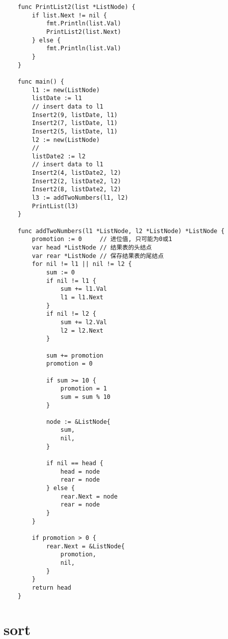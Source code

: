\documentclass[oneside,12pt,twiside,a4paper]{ctexbook}
\begin{document}
\begin{lstlisting}
    func PrintList2(list *ListNode) {
        if list.Next != nil {
            fmt.Println(list.Val)
            PrintList2(list.Next)
        } else {
            fmt.Println(list.Val)
        }
    }
    
    func main() {
        l1 := new(ListNode)
        listDate := l1
        // insert data to l1
        Insert2(9, listDate, l1)
        Insert2(7, listDate, l1)
        Insert2(5, listDate, l1)
        l2 := new(ListNode)
        //
        listDate2 := l2
        // insert data to l1
        Insert2(4, listDate2, l2)
        Insert2(2, listDate2, l2)
        Insert2(8, listDate2, l2)
        l3 := addTwoNumbers(l1, l2)
        PrintList(l3)
    }
    
    func addTwoNumbers(l1 *ListNode, l2 *ListNode) *ListNode {
        promotion := 0     // 进位值, 只可能为0或1
        var head *ListNode // 结果表的头结点
        var rear *ListNode // 保存结果表的尾结点
        for nil != l1 || nil != l2 {
            sum := 0
            if nil != l1 {
                sum += l1.Val
                l1 = l1.Next
            }
            if nil != l2 {
                sum += l2.Val
                l2 = l2.Next
            }
    
            sum += promotion
            promotion = 0
    
            if sum >= 10 {
                promotion = 1
                sum = sum % 10
            }
    
            node := &ListNode{
                sum,
                nil,
            }
    
            if nil == head {
                head = node
                rear = node
            } else {
                rear.Next = node
                rear = node
            }
        }
    
        if promotion > 0 {
            rear.Next = &ListNode{
                promotion,
                nil,
            }
        }
        return head
    }    
\end{lstlisting}

\chapter{sort}
\end{document}
